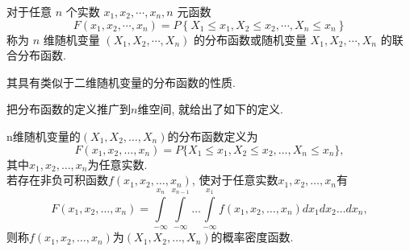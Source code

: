     \begin{definition}
        对于任意 $n$ 个实数 $x_1, x_2, \cdots, x_n, n$ 元函数
        $$
            F\left(x_1, x_2, \cdots, x_n\right)=P\left\{X_1 \leqslant x_1, X_2 \leqslant x_2, \cdots, X_n \leqslant x_n\right\}
        $$
        称为 $n$ 维随机变量 $\left(X_1, X_2, \cdots, X_n\right)$ 的分布函数或随机变量 $X_1, X_2, \cdots, X_n$ 的联合分布函数.
    \end{definition}
    其具有类似于二维随机变量的分布函数的性质.
    
    把分布函数的定义推广到$n$维空间, 就给出了如下的定义. 

\begin{definition}
    n维随机变量的$(X_1,X_2,\dots,X_n)$的分布函数定义为
     \[F(x_1,x_2,\dots,x_n) = P\{X_1 \leq x_1,X_2 \leq x_2,\dots,X_n \leq x_n\},\]
    其中\(x_1,x_2,\dots,x_n\)为任意实数.\\
    若存在非负可积函数$f(x_1,x_2,\dots,x_n)$, 使对于任意实数$x_1,x_2,\dots,x_n$有
    \[F(x_1,x_2,\dots,x_n) = \int\limits_{-\infty}^{x_n}\int\limits_{-\infty}^{x_{n-1}} \dots \int\limits_{-\infty}^{x_1}f(x_1,x_2,\dots,x_n)d{x_1}d{x_2} \dots d{x_n},\]
    则称\(f(x_1,x_2,\dots,x_n)\)为\((X_1,X_2,\dots,X_n)\)的概率密度函数.
\end{definition}